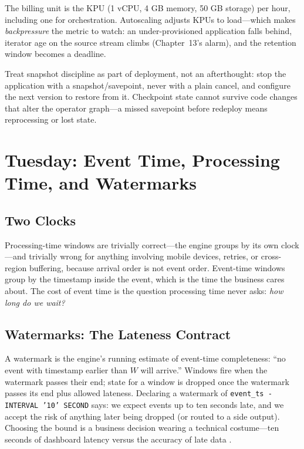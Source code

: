 The billing unit is the KPU (1 vCPU, 4 GB memory, 50 GB storage) per hour, including one for orchestration. Autoscaling adjusts KPUs to load---which makes \emph{backpressure} the metric to watch: an under-provisioned application falls behind, iterator age on the source stream climbs (Chapter~13's alarm), and the retention window becomes a deadline.

\begin{tipbox}
Treat snapshot discipline as part of deployment, not an afterthought: stop the application with a snapshot/savepoint, never with a plain cancel, and configure the next version to restore from it. Checkpoint state cannot survive code changes that alter the operator graph---a missed savepoint before redeploy means reprocessing or lost state.
\end{tipbox}

\section{Tuesday: Event Time, Processing Time, and Watermarks}
\subsection{Two Clocks}
Processing-time windows are trivially correct---the engine groups by its own clock---and trivially wrong for anything involving mobile devices, retries, or cross-region buffering, because arrival order is not event order. Event-time windows group by the timestamp inside the event, which is the time the business cares about. The cost of event time is the question processing time never asks: \emph{how long do we wait?}

\subsection{Watermarks: The Lateness Contract}
A watermark is the engine's running estimate of event-time completeness: ``no event with timestamp earlier than $W$ will arrive.'' Windows fire when the watermark passes their end; state for a window is dropped once the watermark passes its end plus allowed lateness. Declaring a watermark of \texttt{event\_ts - INTERVAL '10' SECOND} says: we expect events up to ten seconds late, and we accept the risk of anything later being dropped (or routed to a side output). Choosing the bound is a business decision wearing a technical costume---ten seconds of dashboard latency versus the accuracy of late data \cite{apacheFlinkDocs,akidauStreamingSystems}.

